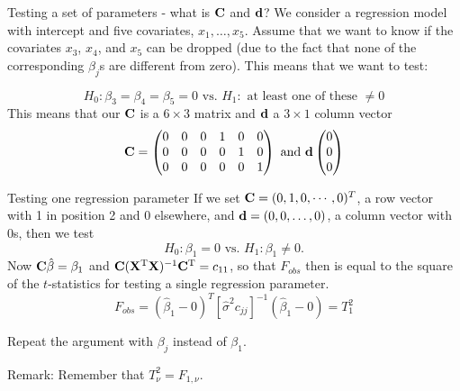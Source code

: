 \documentclass[
  ignorenonframetext,
]{beamer}
\begin{document}
\begin{frame}
\begin{block}{Testing a set of parameters - what is \({\bf C}\) and
\({\bf d}\)?}
\label{testing-a-set-of-parameters---what-is-bf-c-and-bf-d}
We consider a regression model with intercept and five covariates,
\(x_1, \ldots, x_5\). Assume that we want to know if the covariates
\(x_3\), \(x_4\), and \(x_5\) can be dropped (due to the fact that none
of the corresponding \(\beta_j\)s are different from zero). This means
that we want to test:

\[H_0: \beta_{3}=\beta_{4}=\beta_{5}=0 \text{ vs. } H_1:\text{ at least one of these }\neq 0\]
This means that our \({\bf C}\) is a \(6\times 3\) matrix and
\({\bf d}\) a \(3 \times 1\) column vector
\[ {\bf C}=\begin{pmatrix} 0 &0 &0 &1 &0&0 \\
0&0&0&0&1&0\\
0&0&0&0&0& 1\\
\end{pmatrix} \text{ and } 
{\bf d} \begin{pmatrix} 0\\0\\0\\ \end{pmatrix}\]
\end{block}
\end{frame}

\begin{frame}
\begin{block}{Testing one regression parameter}
\label{testing-one-regression-parameter}
If we set \({\bf C}=(0,1, 0, \cdots, 0)^T\), a row vector with 1 in
position 2 and 0 elsewhere, and \({\bf d}=(0,0,\ldots,0)\), a column
vector with 0s, then we test
\[ H_0: \beta_1=0 \text{ vs. } H_1: \beta_1\neq 0.\] Now
\({\bf C}\hat{\beta}=\beta_1\) and
\({\bf C}({\bf X}^{\text T}{\bf X})^{-1}{\bf C}^{\text T}=c_{11}\), so
that \(F_{obs}\) then is equal to the square of the \(t\)-statistics for
testing a single regression parameter.
\[F_{obs}=(\hat{\beta}_1-0)^T[\hat{\sigma}^2 c_{jj}]^{-1}(\hat{\beta}_1-0)=T_1^2\]

Repeat the argument with \(\beta_j\) instead of \(\beta_1\).

Remark: Remember that \(T_{\nu}^2=F_{1,\nu}\).
\end{block}
\end{frame}
\end{document}
